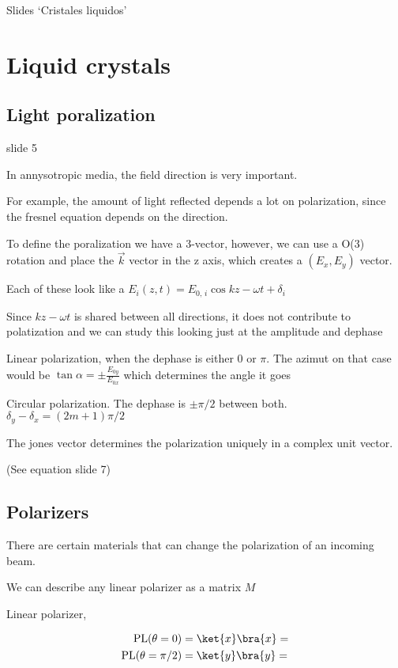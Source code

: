 \documentclass[../main/main.tex]{subfiles}
\begin{document}
Slides `Cristales liquidos'

\chapter{Liquid crystals}

\section{Light poralization}

slide 5

In annysotropic media, the field direction is very important.

For example, the amount of light reflected depends a lot on polarization, since the fresnel equation depends on the direction.

To define the poralization we have a 3-vector, however, we can use a O(3) rotation and place the $\vec{k}$ vector in the z axis, which creates a $(E_x, E_y)$ vector.

Each of these look like a $E_i(z,t) = E_{0,\,i}\cos{k z - \omega t + \delta_i}$

Since $k z - \omega t$ is shared between all directions, it does not contribute to polatization and we can study this looking just at the amplitude and dephase

Linear polarization, when the dephase is either 0 or $\pi$. The azimut on that case would be $\tan \alpha = \pm \frac{E_{0y}}{E_{0x}}$ which determines the angle it goes

Circular polarization. The dephase is $\pm \pi/2$ between both. $\delta_y - \delta_x = (2m + 1)\pi/2$


The jones vector determines the polarization uniquely in a complex unit vector.

(See equation slide 7)

\section{Polarizers}

There are certain materials that can change the polarization of an incoming beam.

We can describe any linear polarizer as a matrix $M$

Linear polarizer,


\begin{align*}
	\textrm{PL}(\theta = 0)       & = \ket{x}\bra{x} = \\
	\textrm{PL}(\theta = \pi / 2) & = \ket{y}\bra{y} =
\end{align*}
\end{document}
